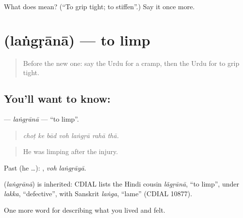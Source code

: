 \begin{tcolorbox}[breakable,colback=teal!4,colframe=teal!35!black,title={Before you move on}]
What does  mean? (\textquotedblleft{}To grip tight; to stiffen\textquotedblright{}.) Say it once more.
\end{tcolorbox}
\section[\texorpdfstring{\ur{لنگڑانا} (laṅgṛānā)}{لنگڑانا (laṅgṛānā)}]{ (laṅgṛānā) — to limp}

\label{lesson:UR-C473-langrana}



\begin{quote}
Before the new one: say the Urdu for a cramp, then the Urdu for to grip tight.
\end{quote}

\subsection*{You'll want to know: }
\textbf{} — \emph{laṅgṛānā} — \textquotedblleft{}to limp\textquotedblright{}.

\begin{quote}
      
\end{quote}

\begin{quote}
\emph{choṭ ke bād voh laṅgṛā rahā thā.}
\end{quote}

\begin{quote}
He was limping after the injury.
\end{quote}

Past (he …):  , \emph{voh laṅgṛāyā}.

\begin{cousinweb}
\textbf{} (\emph{laṅgṛānā}) is inherited: CDIAL lists the Hindi cousin \emph{lãgṛānā}, \textquotedblleft{}to limp\textquotedblright{}, under \emph{lakka}, \textquotedblleft{}defective\textquotedblright{}, with Sanskrit \emph{laṅga}, \textquotedblleft{}lame\textquotedblright{} (CDIAL 10877).
\end{cousinweb}

\begin{grammarlens}[title={What you've built}]
One more word for describing what you lived and felt.
\end{grammarlens}

